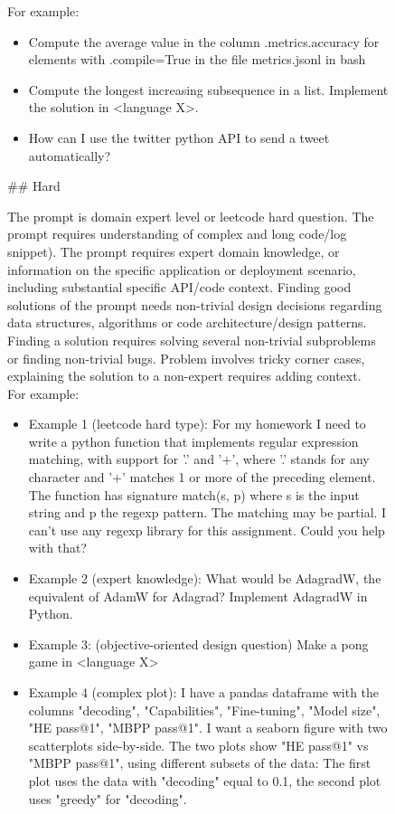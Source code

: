 \begin{figure}
\begin{framed}
For example:

\begin{itemize}
    \item Compute the average value in the column .metrics.accuracy for elements with .compile=True in the file metrics.jsonl in bash
    \item Compute the longest increasing subsequence in a list. Implement the solution in <language X>. 
    \item How can I use the twitter python API to send a tweet automatically?
\end{itemize}

\vspace{5mm}
\#\# Hard

The prompt is domain expert level or leetcode hard question. The prompt requires understanding of complex and long code/log snippet). The prompt requires expert domain knowledge, or information on the specific application or deployment scenario, including substantial specific API/code context. Finding good solutions of the prompt needs non-trivial design decisions regarding data structures, algorithms or code architecture/design patterns. Finding a solution requires solving several non-trivial subproblems or finding non-trivial bugs. Problem involves tricky corner cases, explaining the solution to a non-expert requires adding context. \\

For example:

\begin{itemize}
    \item Example 1 (leetcode hard type):
For my homework I need to write a python function that implements regular expression matching, with support for '.' and '+', where '.' stands for any character and '+' matches 1 or more of the preceding element. The function has signature match(s, p) where s is the input string and p the regexp pattern. The matching may be partial. I can't use any regexp library for this assignment. Could you help with that?
\item Example 2 (expert knowledge):
What would be AdagradW, the equivalent of AdamW for Adagrad? Implement AdagradW in Python.

\item Example 3: (objective-oriented design question) Make a pong game in <language X>

\item Example 4 (complex plot):
I have a pandas dataframe with the columns "decoding", "Capabilities", "Fine-tuning", "Model size", "HE pass@1", "MBPP pass@1". I want a seaborn figure with two scatterplots side-by-side. The two plots show "HE pass@1" vs "MBPP pass@1", using different subsets of the data: The first plot uses the data with "decoding" equal to 0.1, the second plot uses
"greedy" for "decoding".


\end{itemize}
\end{framed}
\end{figure}
